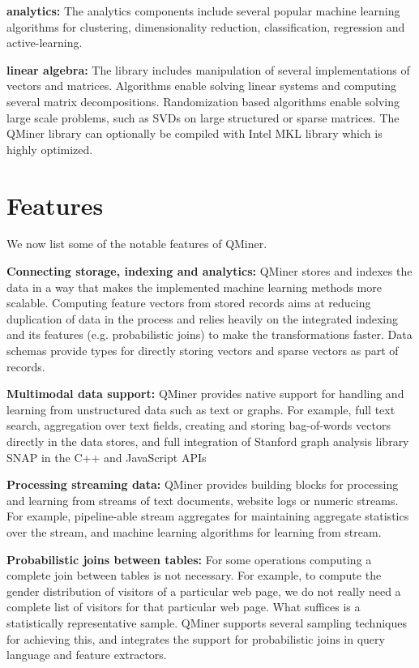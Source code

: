 \documentclass{article} %
\begin{document}
\textbf{analytics:} The analytics components include several popular machine learning algorithms for clustering, dimensionality reduction, classification, regression and
 active-learning.

\textbf{linear algebra:} The library includes manipulation of several implementations of vectors and matrices. Algorithms enable solving linear systems and computing several
matrix decompositions. Randomization based algorithms enable solving large scale problems, such as SVDs on large structured or sparse matrices. The QMiner library can optionally be compiled with Intel MKL library which is highly optimized.




\section{Features}
We now list some of the notable features of QMiner.

\textbf{Connecting storage, indexing and analytics:} QMiner stores and indexes the data in a way that makes the implemented machine learning methods more scalable. Computing feature vectors from stored records aims at reducing duplication of data in the process and relies heavily on the integrated indexing and its features (e.g. probabilistic joins) to make the transformations faster. Data schemas provide types for directly storing vectors and sparse vectors as part of records.

\textbf{Multimodal data support:} QMiner provides native support for handling and learning from unstructured data such as text or graphs. For example, full text search, aggregation over text fields, creating and storing bag-of-words vectors directly in the data stores, and full integration of Stanford graph analysis library SNAP in the C++ and JavaScript APIs

\textbf{Processing streaming data:} QMiner provides building blocks for processing and learning from streams of text documents, website logs or numeric streams. For example, pipeline-able stream aggregates for maintaining aggregate statistics over the stream, and machine learning algorithms for learning from stream.

\textbf{Probabilistic joins between tables:} For some operations computing a complete join between tables is not necessary. For example, to compute the gender distribution of visitors of a particular web page, we do not really need a complete list of visitors for that particular web page. What suffices is a statistically representative sample. QMiner supports several sampling techniques for achieving this, and integrates the support for probabilistic joins in query language and feature extractors.
\end{document}
